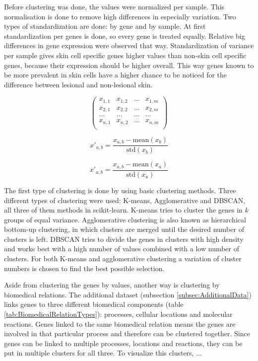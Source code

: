 \documentclass[10pt,a4paper]{article}
\begin{document}
	Before clustering was done, the values were normalized per sample. This normalisation is done to remove high differences in especially variation. Two types of standardization are done: by gene and by sample. At first standardization per genes is done, so every gene is treated equally. Relative big differences in gene expression were observed that way. Standardization of variance per sample gives skin cell specific genes higher values than non-skin cell specific genes, because their expression should be higher overall. This way genes known to be more prevalent in skin cells have a higher chance to be noticed for the difference between lesional and non-lesional skin.
	
	$$
	\begin{pmatrix}
		x_{1,1} & x_{1,2} & ... & x_{1,m} \\
		x_{2,1} & x_{2,2} & ... & x_{2,m} \\
		... & ... & ... & ... \\
		x_{n,1} & x_{n,2} & ... & x_{n,m} \\
	\end{pmatrix}
	$$
	
	
	\begin{equation}
	x'_{a,b} = \frac{x_{a,b} - \text{mean}(x_b)}{\text{std}(x_b)}
	\end{equation}
	
	\begin{equation}
	x'_{a,b} = \frac{x_{a,b} - \text{mean}(x_a)}{\text{std}(x_a)}
	\end{equation}
	
	The first type of clustering is done by using basic clustering methods. Three different types of clustering were used: K-means, Agglomerative and DBSCAN, all three of them methods in scikit-learn. K-means tries to cluster the genes in $k$ groups of equal variance. Agglomerative clustering is also known as hierarchical bottom-up clustering, in which clusters are merged until the desired number of clusters is left. DBSCAN tries to divide the genes in clusters with high density and works best with a high number of values combined with a low number of clusters. For both K-means and agglomerative clustering a variation of cluster numbers is chosen to find the best possible selection. 
	
	Aside from clustering the genes by values, another way is clustering by biomedical relations. The additional dataset (subsection \ref{subsec:AdditionalData}) links genes to three different biomedical components (table \ref{tab:BiomedicalRelationTypes}): processes, cellular locations and molecular reactions. Genes linked to the same biomedical relation means the genes are involved in that particular process and therefore can be clustered together. Since genes can be linked to multiple processes, locations and reactions, they can be put in multiple clusters for all three. To visualize this clusters, ...
	
\end{document}
